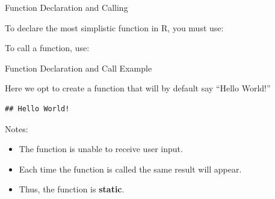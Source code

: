 \begin{frame}[fragile]{Function Declaration and Calling}

To declare the most simplistic function in R, you must use:

\begin{Shaded}
\begin{Highlighting}[]
\StringTok{ }
\NormalTok{\}}
\end{Highlighting}
\end{Shaded}

To call a function, use:

\begin{Shaded}
\begin{Highlighting}[]
\NormalTok{()}
\end{Highlighting}
\end{Shaded}

\end{frame}

\begin{frame}[fragile]{Function Declaration and Call Example}

Here we opt to create a function that will by default say ``Hello
World!''

\begin{Shaded}
\begin{Highlighting}[]
\StringTok{ }
  \NormalTok{(}\NormalTok{)    }
\NormalTok{\}}

\NormalTok{()              }
\end{Highlighting}
\end{Shaded}

\begin{verbatim}
## Hello World!
\end{verbatim}

Notes:

\begin{itemize}
\tightlist
\item
  The function is unable to receive user input.
\item
  Each time the function is called the same result will appear.
\item
  Thus, the function is \textbf{static}.
\end{itemize}

\end{frame}

